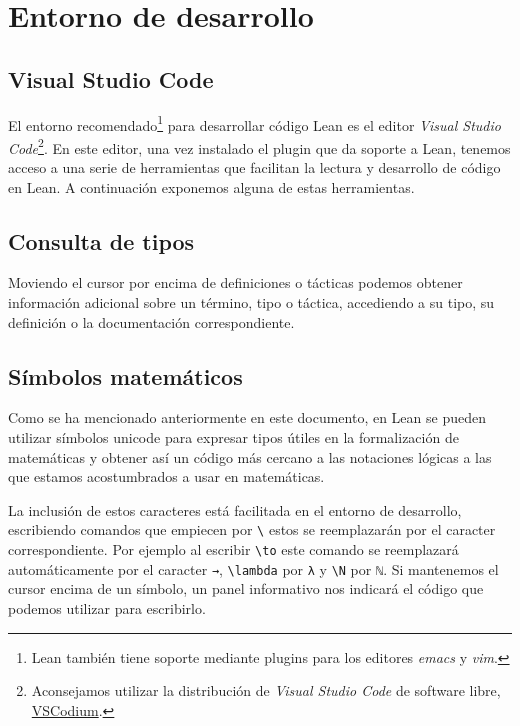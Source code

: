 \section{Entorno de desarrollo}\label{sec:entorno}

\subsection*{Visual Studio Code}

El entorno recomendado\footnote{Lean también tiene soporte mediante plugins para
	los editores \textit{emacs} y \textit{vim}.} para desarrollar código
Lean es el editor \textit{Visual Studio Code}\footnote{Aconsejamos
	utilizar la distribución de \textit{Visual Studio Code} de software libre,
	\href{https://vscodium.com/}{VSCodium}.}. En este editor, una vez instalado el
plugin que da soporte a Lean, tenemos acceso a una serie de
herramientas que facilitan la lectura y desarrollo de código en Lean. A
continuación exponemos alguna de estas herramientas.

\subsection*{Consulta de tipos}

Moviendo el cursor por encima de definiciones o tácticas podemos obtener
información adicional sobre un término, tipo o táctica, accediendo a su tipo, su
definición o la documentación correspondiente.

\subsection*{S\'{i}mbolos matem\'{a}ticos}

Como se ha mencionado anteriormente en este documento, en Lean se
pueden utilizar símbolos unicode para expresar tipos útiles en la formalización
de matemáticas y obtener así un código más cercano a las notaciones lógicas a
las que estamos acostumbrados a usar en matemáticas.

La inclusión de estos caracteres está facilitada en el entorno de desarrollo,
escribiendo comandos que empiecen por \texttt{\textbackslash} estos se
reemplazarán por el caracter correspondiente. Por ejemplo al escribir
\texttt{\textbackslash to} este comando se reemplazará automáticamente por el
caracter \lstinline{→}, \texttt{\textbackslash lambda} por \lstinline{λ} y
\texttt{\textbackslash N} por \lstinline{ℕ}. Si mantenemos el cursor encima de
un símbolo, un panel informativo nos indicará el código que podemos utilizar
para escribirlo.

